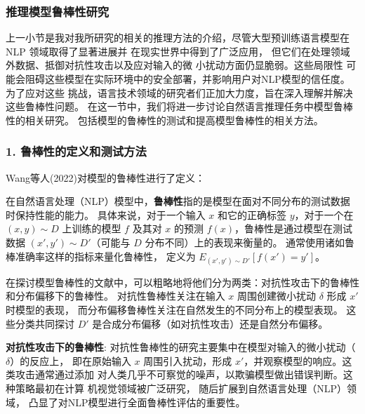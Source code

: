 \subsubsection{推理模型鲁棒性研究}
\label{sec1:robustness}
上一小节是我对我所研究的相关的推理方法的介绍，尽管大型预训练语言模型在NLP
领域取得了显著进展并
在现实世界中得到了广泛应用，
但它们在处理领域外数据、抵御对抗性攻击\cite{mccoy2019right,jin2020bert}以及应对输入的微
小扰动\cite{ebrahimi2018hotflip,belinkov2018synthetic}方面仍显脆弱。这些局限性
可能会阻碍这些模型在实际环境中的安全部署，并影响用户对NLP模型的信任度。为了应对这些
挑战，语言技术领域的研究者们正加大力度，旨在深入理解并解决这些鲁棒性问题。
在这一节中，我们将进一步讨论自然语言推理任务中模型鲁棒性的相关研究。
包括模型的鲁棒性的测试和提高模型鲁棒性的相关方法。

\subsubsection*{1. 鲁棒性的定义和测试方法}

Wang等人(2022)\cite{wang2022measure}对模型的鲁棒性进行了定义：

\begin{definition}[鲁棒性]
在自然语言处理（NLP）模型中，\textbf{鲁棒性}指的是模型在面对不同分布的测试数据时保持性能的能力。
具体来说，对于一个输入 $x$ 和它的正确标签 $y$，对于一个在 $(x, y) \sim D$ 上训练的模型 
$f$ 及其对 $x$ 的预测 $f(x)$，鲁棒性是通过模型在测试数据 
$(x', y') \sim D'$（可能与 $D$ 分布不同）上的表现来衡量的。
通常使用诸如鲁棒准确率这样的指标来量化鲁棒性，
定义为 $E_{(x', y') \sim D'}[f(x') = y']$。
\end{definition}

在探讨模型鲁棒性的文献中，可以粗略地将他们分为两类：对抗性攻击下的鲁棒性和分布偏移下的鲁棒性。
对抗性鲁棒性关注在输入 $x$ 周围创建微小扰动 $\delta$ 形成 $x'$ 时模型的表现，
而分布偏移鲁棒性关注在自然发生的不同分布上的模型表现。
这些分类共同探讨 $D'$ 是合成分布偏移（如对抗性攻击）还是自然分布偏移。

\textbf{对抗性攻击下的鲁棒性}:
对抗性鲁棒性的研究主要集中在模型对输入的微小扰动（$\delta$）的反应上，
即在原始输入 $x$ 周围引入扰动，形成 $x'$，并观察模型的响应。这类攻击通常通过添加
对人类几乎不可察觉的噪声，以欺骗模型做出错误判断。这种策略最初在计算
机视觉领域被广泛研究\cite{szegedy2014intriguing,goodfellow2014explaining}，
随后扩展到自然语言处理（NLP）领域\cite{Marco2020acl,tan2020s,schwinn2023exploring,boucher2022bad}，
凸显了对NLP模型进行全面鲁棒性评估的重要性。

